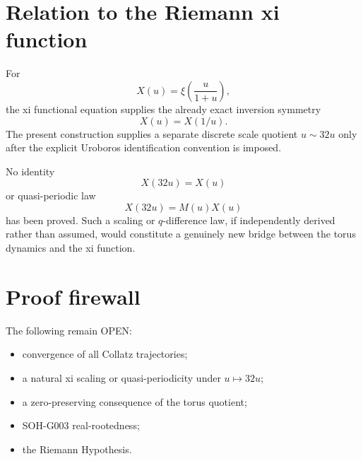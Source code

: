 \section{Relation to the Riemann xi function}

For
\[
X(u)=\xi\!\left(\frac{u}{1+u}\right),
\]
the xi functional equation supplies the already exact inversion symmetry
\[
\boxed{X(u)=X(1/u).}
\]
The present construction supplies a separate discrete scale quotient \(u\sim32u\) only after the explicit Uroboros identification convention is imposed.

No identity
\[
X(32u)=X(u)
\]
or quasi-periodic law
\[
X(32u)=M(u)X(u)
\]
has been proved. Such a scaling or \(q\)-difference law, if independently derived rather than assumed, would constitute a genuinely new bridge between the torus dynamics and the xi function.

\section{Proof firewall}

The following remain OPEN:
\begin{itemize}
\item convergence of all Collatz trajectories;
\item a natural xi scaling or quasi-periodicity under \(u\mapsto32u\);
\item a zero-preserving consequence of the torus quotient;
\item SOH-G003 real-rootedness;
\item the Riemann Hypothesis.
\end{itemize}
